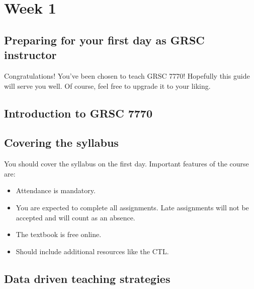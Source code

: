 \section{Week 1}
\label{sec:week-1}

\subsection{Preparing for your first day as GRSC instructor}
\label{sec:preparing-your-first}

Congratulations!  You've been chosen to teach GRSC 7770!  Hopefully this guide will serve you well.  Of course, feel free to upgrade it to your liking.

\subsection{Introduction to GRSC 7770}
\label{sec:intr-grsc-7770}

\subsection{Covering the syllabus}
\label{sec:covering-syllabus}

You should cover the syllabus on the first day.  Important features of the course are:
\begin{itemize}
\item Attendance is mandatory.
\item You are expected to complete all assignments.  Late assignments will not be accepted and will count as an absence.
\item The textbook is free online.
\item Should include additional resources like the CTL.
\end{itemize}

\subsection{Data driven teaching strategies}
\label{sec:data-driven-teaching} 



